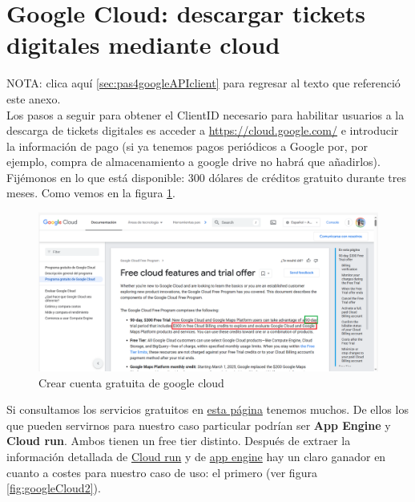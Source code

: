 \documentclass[a4paper,12pt]{report}
\begin{document}
	
	

	\endgroup
	
	
	\section{Google Cloud: descargar tickets digitales mediante cloud}
	\label{sec:googleCloud}
	
		NOTA: clica aquí \ref{sec:pas4googleAPIclient} para regresar al texto que referenció este anexo.\\
		
	
		Los pasos a seguir para obtener el ClientID necesario para habilitar usuarios a la descarga de tickets digitales es acceder a \href{https://cloud.google.com}{https://cloud.google.com/} e introducir la información de pago (si ya tenemos pagos periódicos a Google por, por ejemplo, compra de almacenamiento a google drive no habrá que añadirlos). Fijémonos en lo que está disponible: 300 dólares de créditos gratuito durante tres meses. Como vemos en la figura \ref{fig:googlecloud1}.
		
		\FloatBarrier
		\begin{figure}[H]
			\centering
			\caption{Crear cuenta gratuita de google cloud}
			\label{fig:googlecloud1}
			\includegraphics[width=1\linewidth]{img/googleCloud1.png}
		\end{figure}
		\FloatBarrier
		
		
		Si consultamos los servicios gratuitos en \href{https://cloud.google.com/free/docs/free-cloud-features?authuser=2#free-tier-usage-limits}{esta página} tenemos muchos. De ellos los que pueden servirnos para nuestro caso particular podrían ser \textbf{App Engine} y \textbf{Cloud run}. Ambos tienen un free tier distinto. Después de extraer la información detallada de \href{https://cloud.google.com/run/docs/overview/what-is-cloud-run?authuser=2&hl=es-419}{Cloud run} y de \href{https://cloud.google.com/appengine/docs/an-overview-of-app-engine?authuser=2&hl=es-419}{app engine} hay un claro ganador en cuanto a costes para nuestro caso de uso: el primero (ver figura \ref{fig:googleCloud2}).
		
\end{document}
